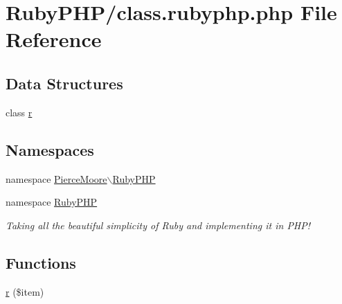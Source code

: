 \hypertarget{class_8rubyphp_8php}{\section{Ruby\-P\-H\-P/class.rubyphp.\-php File Reference}
\label{class_8rubyphp_8php}
}
\subsection*{Data Structures}
\begin{DoxyCompactItemize}
\item 
class \hyperlink{class_pierce_moore_1_1_ruby_p_h_p_1_1r}{r}
\end{DoxyCompactItemize}
\subsection*{Namespaces}
\begin{DoxyCompactItemize}
\item 
namespace \hyperlink{namespace_pierce_moore_1_1_ruby_p_h_p}{Pierce\-Moore$\backslash$\-Ruby\-P\-H\-P}
\item 
namespace \hyperlink{namespace_ruby_p_h_p}{Ruby\-P\-H\-P}
\begin{DoxyCompactList}\small\item\em Taking all the beautiful simplicity of Ruby and implementing it in P\-H\-P! \end{DoxyCompactList}\end{DoxyCompactItemize}
\subsection*{Functions}
\begin{DoxyCompactItemize}
\item 
\hyperlink{namespace_pierce_moore_1_1_ruby_p_h_p_add70f208c72bf2a57bc4ff08438cfed8}{r} (\$item)
\end{DoxyCompactItemize}
